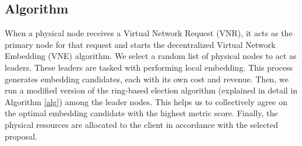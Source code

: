 \subsection{Algorithm}
When a physical node receives a Virtual Network Request (VNR), it acts as the primary node for that request and starts the decentralized Virtual Network Embedding (VNE) algorithm. We select a random list of physical nodes to act as leaders. These leaders are tasked with performing local embedding. This process generates embedding candidates, each with its own cost and revenue.
%
Then, we run a modified version of the ring-based election algorithm (explained in detail in Algorithm \ref{alg}) among the leader nodes. This helps us to collectively agree on the optimal embedding candidate with the highest metric score. Finally, the physical resources are allocated to the client in accordance with the selected proposal.

